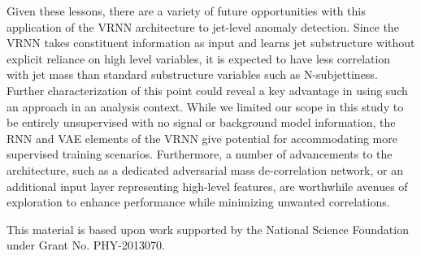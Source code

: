\documentclass[letterpaper,11pt]{article}
\begin{document}
Given these lessons, there are a variety of future opportunities with this application of the VRNN architecture to jet-level anomaly detection. 
Since the VRNN takes constituent information as input and learns jet substructure without explicit reliance on high level variables, it is expected to have less correlation with jet mass than standard substructure variables such as N-subjettiness. Further characterization of this point could reveal a key advantage in using such an approach in an analysis context.
While we limited our scope in this study to be entirely unsupervised with no signal or background model information, the RNN and VAE elements of the VRNN give potential for accommodating more supervised training scenarios. 
Furthermore, a number of advancements to the architecture, such as a dedicated adversarial mass de-correlation network, or an additional input layer representing high-level features, are worthwhile avenues of exploration to enhance performance while minimizing unwanted correlations. 


\acknowledgments

This material is based upon work supported by the National Science Foundation under Grant No. PHY-2013070.




%

\end{document}
